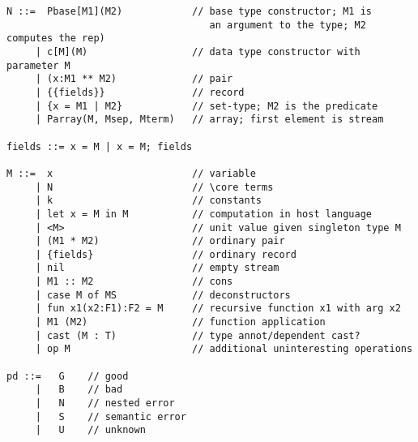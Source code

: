 {\small
\begin{verbatim}
N ::=  Pbase[M1](M2)            // base type constructor; M1 is
                                   an argument to the type; M2 computes the rep)
     | c[M](M)                  // data type constructor with parameter M
     | (x:M1 ** M2)             // pair
     | {{fields}}               // record
     | {x = M1 | M2}            // set-type; M2 is the predicate
     | Parray(M, Msep, Mterm)   // array; first element is stream

fields ::= x = M | x = M; fields

M ::=  x                        // variable
     | N                        // \core terms
     | k                        // constants
     | let x = M in M           // computation in host language
     | <M>                      // unit value given singleton type M
     | (M1 * M2)                // ordinary pair
     | {fields}                 // ordinary record
     | nil                      // empty stream
     | M1 :: M2                 // cons
     | case M of MS             // deconstructors
     | fun x1(x2:F1):F2 = M     // recursive function x1 with arg x2
     | M1 (M2)                  // function application
     | cast (M : T)             // type annot/dependent cast?
     | op M                     // additional uninteresting operations
     
pd ::=   G    // good
     |   B    // bad
     |   N    // nested error
     |   S    // semantic error
     |   U    // unknown
\end{verbatim}
}

